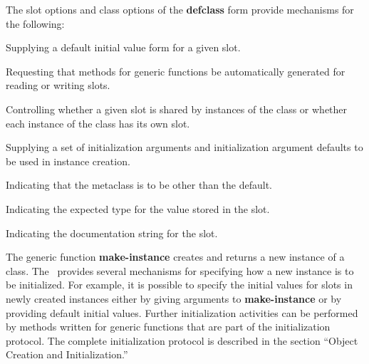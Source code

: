 The slot options and class options of the {\bf defclass} form provide
mechanisms for the following:

\beginlist

\item{\bull} Supplying a default initial value form for a given slot.  

\item{\bull} Requesting that methods for generic functions
be automatically generated for reading or writing slots. 

\item{\bull} Controlling whether a given slot is shared by instances
of the class or whether each instance of the class has its own slot.

\item{\bull} Supplying a set of initialization arguments and initialization
argument defaults to be used in instance creation.


\item{\bull} Indicating that the metaclass is to be other than the default.

\item{\bull} Indicating the expected type for the value stored in the slot.

\item{\bull} Indicating the documentation string for the slot.

\endlist 

\endsubSection%

\goodbreak


The generic function {\bf make-instance} creates and returns a new
instance of a class.  The \OS\ provides several mechanisms for
specifying how a new instance is to be initialized.  For example, it
is possible to specify the initial values for slots in newly created
instances either by giving arguments to {\bf make-instance} or by
providing default initial values.  Further initialization activities
can be performed by methods written for generic functions that are
part of the initialization protocol.  The complete initialization
protocol is described in the section ``Object Creation and
Initialization.''

\endsubSection%

